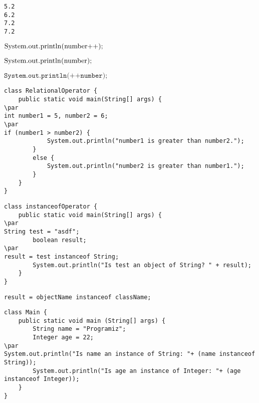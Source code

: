 \documentclass{book}
\def\lthtmlcheckvsize{\ifdim\ht\sizebox<\vsize 
  \ifdim\wd\sizebox<\hsize\expandafter\hfill\fi \expandafter\vfill
  \else\expandafter\vss\fi}%
\begin{document}
{\newpage\clearpage
{}%
\begin{lstlisting}
5.2
6.2
7.2
7.2
\end{lstlisting}%
\lthtmlfigureZ
\lthtmlcheckvsize\clearpage}

{\newpage\clearpage
{}%
$\lstinline{System.out.println(number++);}$%
\lthtmlindisplaymathZ
\lthtmlcheckvsize\clearpage}

{\newpage\clearpage
{}%
$\lstinline{System.out.println(number);}$%
\lthtmlindisplaymathZ
\lthtmlcheckvsize\clearpage}

{\newpage\clearpage
{}%
$\texttt{System.out.println(++number);}$%
\lthtmlindisplaymathZ
\lthtmlcheckvsize\clearpage}

{\newpage\clearpage
{}%
\begin{lstlisting}
class RelationalOperator {
    public static void main(String[] args) {
\par
int number1 = 5, number2 = 6;
\par
if (number1 > number2) {
            System.out.println("number1 is greater than number2.");
        }
        else {
            System.out.println("number2 is greater than number1.");
        }
    }
}
\end{lstlisting}%
\lthtmlfigureZ
\lthtmlcheckvsize\clearpage}

{\newpage\clearpage
{}%
\begin{lstlisting}
class instanceofOperator {
    public static void main(String[] args) {
\par
String test = "asdf";
        boolean result;
\par
result = test instanceof String;
        System.out.println("Is test an object of String? " + result);
    }
}
\end{lstlisting}%
\lthtmlfigureZ
\lthtmlcheckvsize\clearpage}

{\newpage\clearpage
{}%
\begin{lstlisting}
result = objectName instanceof className;
\end{lstlisting}%
\lthtmlfigureZ
\lthtmlcheckvsize\clearpage}

{\newpage\clearpage
{}%
\begin{lstlisting}
class Main {
    public static void main (String[] args) {
        String name = "Programiz";
        Integer age = 22;
\par
System.out.println("Is name an instance of String: "+ (name instanceof String));
        System.out.println("Is age an instance of Integer: "+ (age instanceof Integer));
    }
}
\end{lstlisting}%
\lthtmlfigureZ
\lthtmlcheckvsize\clearpage}
\end{document}
